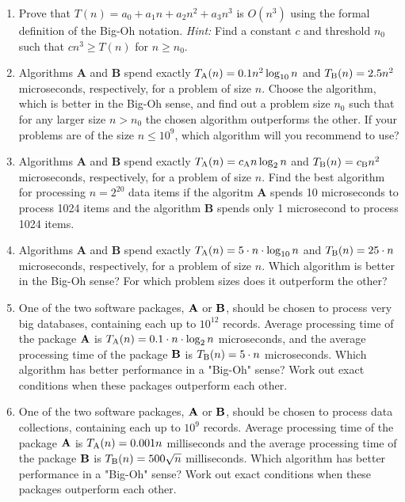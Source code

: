 \documentclass[]{article}
\begin{document}
\begin{enumerate}
\item Prove that $T(n)=a_{0}+a_{1}n+a_{2}n^{2}+a_{3}n^{3}$
is $O(n^{3})$ using the formal definition of the Big-Oh
notation. {\it Hint:} Find a constant $c$ and threshold $n_0$ such that 
$cn^3 \ge T(n)$ for $n \ge n_0$.

\item Algorithms \textbf{A} and 
\textbf{B} spend
exactly \(T_{\rm A}(n) = 0.1 n^{2} \log_{10}n\)
and \(T_{\rm B}(n) = 2.5 n^{2}\) microseconds, respectively,
for a problem of size \(n\).
Choose the algorithm, which is better in the Big-Oh sense, and
find out a problem size \(n_{0}\) such that for any larger 
size \(n > n_{0}\) the chosen algorithm outperforms the
other. If your problems are of the size $n \le 10^{9}$,
which algorithm will you recommend to use?\\ 
        
\item  Algorithms \textbf{A} and 
\textbf{B} spend
exactly \(T_{\rm A}(n) = c_{\rm A} n \log_{2}n\)
and \(T_{\rm B}(n) = c_{\rm B} n^{2}\) microseconds, respectively,
for a problem of size \(n\).
Find the best algorithm for processing \(n=2^{20}\) data items if
the algoritm {\bf A} spends 10 microseconds
to process 1024 items and the algorithm {\bf B}
spends only 1 microsecond to process 1024 items.

\item Algorithms \textbf{A} and \textbf{B} 
spend exactly \(T_{\rm A}(n) = 5 \cdot n \cdot \log_{10}n\)
and \(T_{\rm B}(n) = 25 \cdot n\) microseconds, respectively,
for a problem of size \(n\). 
Which algorithm is better in the Big-Oh sense? For
which problem sizes does it outperform the
other?
         
\item 
One of the two software packages, ${\bf A}$ or ${\bf B}$,
should be chosen to process very big
databases, containing each up to $10^{12}$ records. Average processing time 
of the package ${\bf A}$ is 
$T_{\rm A}(n) = 0.1 \cdot n \cdot \log_{2}n$ microseconds, and 
the average processing time of the package ${\bf B}$ is 
$T_{\rm B}(n) = 5 \cdot n$ microseconds. Which algorithm has 
better performance in a "Big-Oh" sense? Work out exact conditions 
when these packages outperform each other.\\

\item One of the two software packages, ${\bf A}$ or ${\bf B}$,
should be chosen to process data collections,
containing each up to $10^{9}$ records. Average processing time 
of the package ${\bf A}$ is 
$T_{\rm A}(n) = 0.001n$ milliseconds and 
the average processing time of the package ${\bf B}$ is 
$T_{\rm B}(n) = 500\sqrt{n}$ milliseconds. Which algorithm has 
better performance in a "Big-Oh" sense? Work out exact conditions 
when these packages outperform each other. \\


\end{enumerate}
\end{document}
